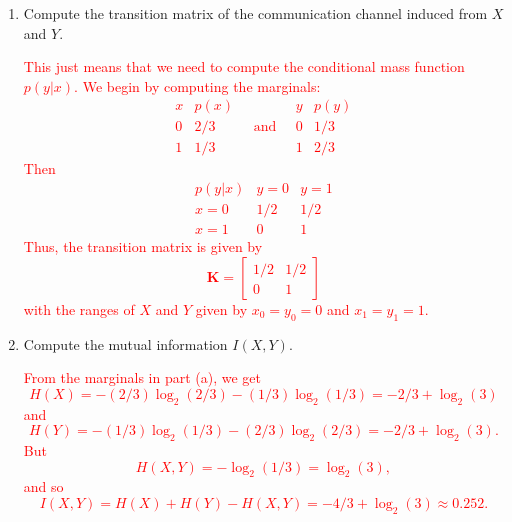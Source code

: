 \documentclass[12pt,reqno]{amsart}
\begin{document}
\bigskip
\begin{enumerate}
\item Compute the transition matrix of the communication channel induced from $X$ and $Y$.

\bigskip
\textcolor{red}{This just means that we need to compute the conditional mass function $p(y|x)$. We begin by computing the marginals:
	\[\begin{array}{c|c}
	x & p(x) \\ \hline
	0 & 2/3 \\
	1 & 1/3
	\end{array} \quad\text{and} \quad
	\begin{array}{c|c}
	y & p(y) \\ \hline
	0 & 1/3 \\
	1 & 2/3
	\end{array}
	\]
Then
	\[\begin{array}{c|cc}
	p(y|x) & y=0 & y=1 \\ \hline
	x = 0 & 1 / 2 & 1 / 2 \\
	x = 1 &  0 & 1
	\end{array}
	\]
Thus, the transition matrix is given by
	\[\mathbf{K} = \begin{bmatrix}
	1 / 2 & 1 / 2 \\
	0 & 1
	\end{bmatrix}
	\]
with the ranges of $X$ and $Y$ given by $x_0=y_0=0$ and $x_1=y_1=1$.}
\bigskip

\item Compute the mutual information $I(X,Y)$.

\bigskip
\textcolor{red}{From the marginals in part (a), we get
	\[H(X) = -(2/3) \log_2(2/3) - (1/3)\log_2(1/3) = -2/3+ \log_2(3)
	\]
and
	\[H(Y) = -(1/3)\log_2(1/3) - (2/3) \log_2(2/3) = -2/3+ \log_2(3).
	\]
But
	\[H(X,Y) = -\log_2(1/3) = \log_2(3),
	\]
and so
	\[
	I(X,Y) = H(X) + H(Y) - H(X,Y) = -4/3 + \log_2(3) \approx 0.252.
	\]}
\bigskip
\end{enumerate}
\end{document}

